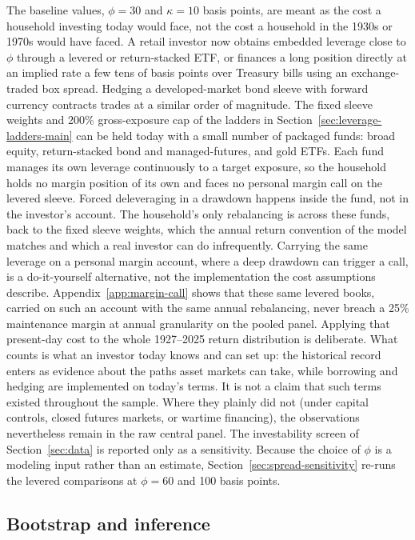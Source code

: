 \documentclass[11pt]{article}
\begin{document}
The baseline values, $\phi = 30$ and $\kappa = 10$ basis points, are meant as
the cost a household investing today would face, not the cost a household in the
1930s or 1970s would have faced. A retail investor now obtains embedded leverage
close to $\phi$ through a levered or return-stacked ETF, or finances a long
position directly at an implied rate a few tens of basis points over Treasury
bills using an exchange-traded box spread. Hedging a developed-market bond
sleeve with forward currency contracts trades at a similar order of magnitude.
The fixed sleeve weights and 200\% gross-exposure cap of the ladders in
Section~\ref{sec:leverage-ladders-main} can be held today with a small number of
packaged funds: broad equity, return-stacked bond and managed-futures, and gold
ETFs. Each fund manages its own leverage continuously to a target exposure, so
the household holds no margin position of its own and faces no personal margin
call on the levered sleeve. Forced deleveraging in a drawdown happens inside the
fund, not in the investor's account. The household's only rebalancing is across
these funds, back to the fixed sleeve weights, which the annual return
convention of the model matches and which a real investor can do infrequently.
Carrying the same leverage on a personal margin account, where a deep drawdown
can trigger a call, is a do-it-yourself alternative, not the implementation the
cost assumptions describe. Appendix~\ref{app:margin-call} shows that these
same levered books, carried on such an account with the same annual
rebalancing, never breach a 25\% maintenance margin at annual granularity on
the pooled panel. Applying
that present-day cost to the whole 1927--2025 return distribution is
deliberate. What counts is what an investor today knows and can set up: the
historical record enters as evidence about the paths asset markets can take,
while borrowing and hedging are implemented on today's terms. It is not a
claim that such terms existed throughout the sample. Where they plainly did
not (under capital controls,
closed futures markets, or wartime financing), the observations nevertheless
remain in the raw central panel. The investability screen of
Section~\ref{sec:data} is reported only as a sensitivity. Because the choice of
$\phi$ is a modeling input rather than an estimate,
Section~\ref{sec:spread-sensitivity} re-runs the levered comparisons
at $\phi = 60$ and 100 basis points.

\subsection{Bootstrap and inference}
\label{sec:bootstrap}
\end{document}
